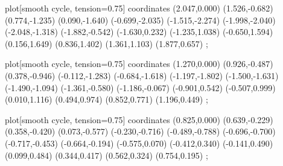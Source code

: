     plot[smooth cycle, tension=0.75] coordinates {
        (2.047,0.000) (1.526,-0.682) (0.774,-1.235)
        (0.090,-1.640) (-0.699,-2.035) (-1.515,-2.274)
        (-1.998,-2.040) (-2.048,-1.318) (-1.882,-0.542)
        (-1.630,0.232) (-1.235,1.038) (-0.650,1.594)
        (0.156,1.649) (0.836,1.402) (1.361,1.103)
        (1.877,0.657)
    };

    plot[smooth cycle, tension=0.75] coordinates {
        (1.270,0.000) (0.926,-0.487) (0.378,-0.946)
        (-0.112,-1.283) (-0.684,-1.618) (-1.197,-1.802)
        (-1.500,-1.631) (-1.490,-1.094) (-1.361,-0.580)
        (-1.186,-0.067) (-0.901,0.542) (-0.507,0.999)
        (0.010,1.116) (0.494,0.974) (0.852,0.771)
        (1.196,0.449)
    };

    plot[smooth cycle, tension=0.75] coordinates {
        (0.825,0.000) (0.639,-0.229) (0.358,-0.420)
        (0.073,-0.577) (-0.230,-0.716) (-0.489,-0.788)
        (-0.696,-0.700) (-0.717,-0.453) (-0.664,-0.194)
        (-0.575,0.070) (-0.412,0.340) (-0.141,0.490)
        (0.099,0.484) (0.344,0.417) (0.562,0.324)
        (0.754,0.195)
    };

